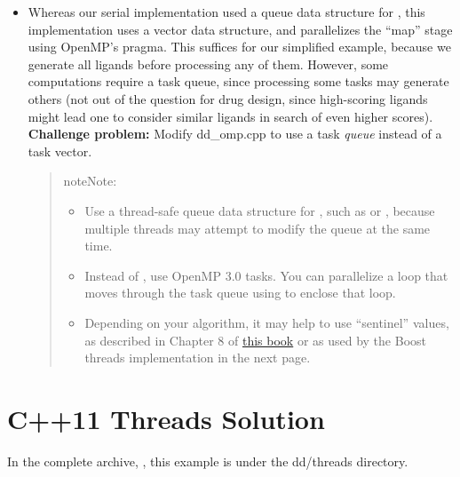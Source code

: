 \documentclass[letterpaper,10pt,openany,oneside]{sphinxmanual}
\begin{document}
\begin{itemize}
\item {} 
Whereas our serial implementation used a queue data structure for , this implementation uses a vector data structure, and parallelizes the “map” stage using OpenMP’s  pragma. This suffices for our simplified example, because we generate all ligands before processing any of them. However, some computations require a task queue, since processing some tasks may generate others (not out of the question for drug design, since high-scoring ligands might lead one to consider similar ligands in search of even higher scores). \textbf{Challenge problem:} Modify dd\_omp.cpp to use a task \emph{queue} instead of a task vector.
\begin{quote}

\begin{notice}{note}{Note:}\begin{itemize}
\item {} 
Use a thread-safe queue data structure for , such as  or , because multiple threads may attempt to modify the queue at the same time.

\item {} 
Instead of , use OpenMP 3.0 tasks.  You can parallelize a  loop that moves through the task queue using  to enclose that loop.

\item {} 
Depending on your algorithm, it may help to use “sentinel” values, as described in Chapter 8 of \href{http://books.google.com/books/about/The\_Art\_of\_Concurrency.html?id=rU68SYVS7S8C}{this book} or as used by the Boost threads implementation in the next page.

\end{itemize}
\end{notice}
\end{quote}

\end{itemize}


\section{C++11 Threads Solution}
\label{c++11threads/c++11threads:c-11-threads-solution}\label{c++11threads/c++11threads:this-book}\label{c++11threads/c++11threads::doc}
In the complete archive, , this example is under the dd/threads directory.
\end{document}
